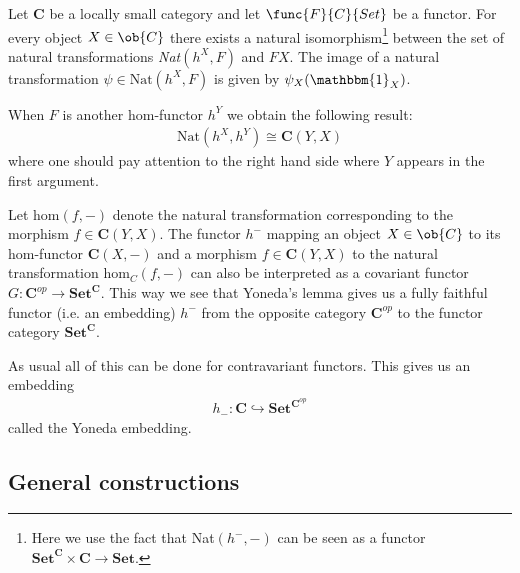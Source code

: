     \begin{theorem}
        Let $\mathbf{C}$ be a locally small category and let $\func{F}{C}{Set}$ be a functor. For every object $X\in\ob{C}$ there exists a natural isomorphism\footnote{Here we use the fact that Nat$(h^-, -)$ can be seen as a functor $\mathbf{Set}^{\mathbf{C}}\times\mathbf{C}\rightarrow\mathbf{Set}$.} between the set of natural transformations \emph{Nat}$(h^X, F)$ and $FX$. The image of a natural transformation $\psi\in\text{Nat}(h^X, F)$ is given by $\psi_X(\mathbbm{1}_X)$.
    \end{theorem}

    \begin{result}
        When $F$ is another hom-functor $h^Y$ we obtain the following result:
        \begin{gather}
            \text{Nat}(h^X, h^Y)\cong\mathbf{C}(Y, X)
        \end{gather}
        where one should pay attention to the right hand side where $Y$ appears in the first argument.

        Let $\text{hom}(f, -)$ denote the natural transformation corresponding to the morphism $f\in\mathbf{C}(Y,X)$. The functor $h^-$ mapping an object $X\in\ob{C}$ to its hom-functor $\mathbf{C}(X, -)$ and a morphism $f\in\mathbf{C}(Y, X)$ to the natural transformation hom$_C(f, -)$ can also be interpreted as a covariant functor $G:\mathbf{C}^{op}\rightarrow\mathbf{Set}^{\mathbf{C}}$. This way we see that Yoneda's lemma gives us a fully faithful functor (i.e. an embedding) $h^-$ from the opposite category $\mathbf{C}^{op}$ to the functor category $\mathbf{Set}^{\mathbf{C}}$.

        As usual all of this can be done for contravariant functors. This gives us an embedding
        \begin{gather}
            h_-:\mathbf{C}\hookrightarrow\mathbf{Set}^{\mathbf{C}^{op}}
        \end{gather}
        called the Yoneda embedding.
    \end{result}

\subsection{General constructions}

